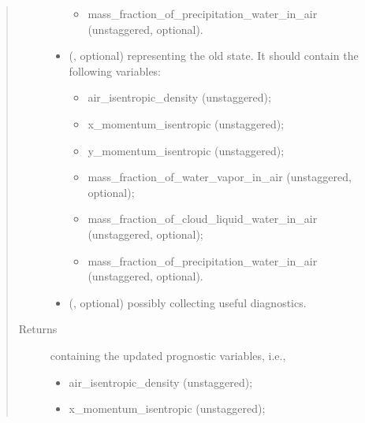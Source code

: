 \documentclass[letterpaper,10pt,english]{sphinxmanual}
\begin{document}
\begin{fulllineitems}
\begin{fulllineitems}
\begin{quote}
\begin{description}
\begin{itemize}
\begin{itemize}
\item {} 
mass\_fraction\_of\_precipitation\_water\_in\_air (unstaggered, optional).

\end{itemize}


\item {} 
 (, optional) \textendash{} 
{\hyperref[\detokenize{api:storages.state_isentropic.StateIsentropic}]{}} representing the old state.
It should contain the following variables:
\begin{itemize}
\item {} 
air\_isentropic\_density (unstaggered);

\item {} 
x\_momentum\_isentropic (unstaggered);

\item {} 
y\_momentum\_isentropic (unstaggered);

\item {} 
mass\_fraction\_of\_water\_vapor\_in\_air (unstaggered, optional);

\item {} 
mass\_fraction\_of\_cloud\_liquid\_water\_in\_air (unstaggered, optional);

\item {} 
mass\_fraction\_of\_precipitation\_water\_in\_air (unstaggered, optional).

\end{itemize}


\item {} 
 (, optional) \textendash{} {\hyperref[\detokenize{api:storages.grid_data.GridData}]{}} possibly collecting useful diagnostics.

\end{itemize}

\item[{Returns}] \leavevmode

{\hyperref[\detokenize{api:storages.state_isentropic.StateIsentropic}]{}} containing the updated prognostic variables, i.e.,
\begin{itemize}
\item {} 
air\_isentropic\_density (unstaggered);

\item {} 
x\_momentum\_isentropic (unstaggered);


\end{itemize}
\end{description}
\end{quote}
\end{fulllineitems}
\end{fulllineitems}
\end{document}
